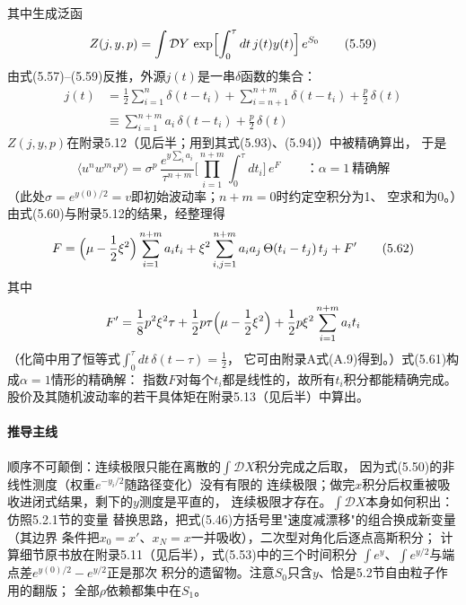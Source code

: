 其中生成泛函
\begin{equation*}
Z(j,y,p)=\int\mathcal{D}Y\,\exp\Bigl[\int_{0}^{\tau}dt\,j(t)y(t)\Bigr]\,e^{S_{0}}
\tag{5.59}
\end{equation*}
由式(5.57)--(5.59)反推，外源$j(t)$是一串$\delta$函数的集合：
\begin{align*}
j(t)&=\frac{1}{2}\sum_{i=1}^{n}\delta(t-t_{i})
+\sum_{i=n+1}^{n+m}\delta(t-t_{i})+\frac{p}{2}\,\delta(t)\\
&\equiv\sum_{i=1}^{n+m}a_{i}\,\delta(t-t_{i})+\frac{p}{2}\,\delta(t)
\tag{5.60}
\end{align*}
$Z(j,y,p)$在附录5.12（见后半；用到其式(5.93)、(5.94)）中被精确算出，
于是
\begin{equation*}
\langle u^{n}w^{m}v^{p}\rangle
=\sigma^{p}\,\frac{e^{y\sum_{i}a_{i}}}{\tau^{n+m}}
\Biggl[\prod_{i=1}^{n+m}\int_{0}^{\tau}dt_{i}\Biggr]\,e^{F}
\qquad\text{：}\alpha=1\ \text{精确解}
\tag{5.61}
\end{equation*}
（此处$\sigma=e^{y(0)/2}=v$即初始波动率；$n+m=0$时约定空积分为1、
空求和为0。）由式(5.60)与附录5.12的结果，经整理得
\begin{equation*}
F=\Bigl(\mu-\frac{1}{2}\xi^{2}\Bigr)\sum_{i=1}^{n+m}a_{i}t_{i}
+\xi^{2}\sum_{i,j=1}^{n+m}a_{i}a_{j}\,\Theta(t_{i}-t_{j})\,t_{j}+F'
\tag{5.62}
\end{equation*}
其中
\begin{equation*}
F'=\frac{1}{8}p^{2}\xi^{2}\tau
+\frac{1}{2}p\tau\Bigl(\mu-\frac{1}{2}\xi^{2}\Bigr)
+\frac{1}{2}p\xi^{2}\sum_{i=1}^{n+m}a_{i}t_{i}
\end{equation*}
（化简中用了恒等式$\int_{0}^{\tau}dt\,\delta(t-\tau)=\frac{1}{2}$，
它可由附录A式(A.9)得到。）式(5.61)构成$\alpha=1$情形的精确解：
指数$F$对每个$t_{i}$都是线性的，故所有$t_{i}$积分都能精确完成。
股价及其随机波动率的若干具体矩在附录5.13（见后半）中算出。

\paragraph{推导主线}
顺序不可颠倒：连续极限只能在离散的$\int\mathcal{D}X$积分完成之后取，
因为式(5.50)的非线性测度（权重$e^{-y_{i}/2}$随路径变化）没有有限的
连续极限；做完$x$积分后权重被吸收进闭式结果，剩下的$y$测度是平直的，
连续极限才存在。$\int\mathcal{D}X$本身如何积出：仿照5.2.1节的变量
替换思路，把式(5.46)方括号里"速度减漂移"的组合换成新变量（其边界
条件把$x_{0}=x'$、$x_{N}=x$一并吸收），二次型对角化后逐点高斯积分；
计算细节原书放在附录5.11（见后半），式(5.53)中的三个时间积分
$\int e^{y}$、$\int e^{y/2}$与端点差$e^{y(0)/2}-e^{y/2}$正是那次
积分的遗留物。注意$S_{0}$只含$y$、恰是5.2节自由粒子作用的翻版；
全部$\rho$依赖都集中在$S_{1}$。

